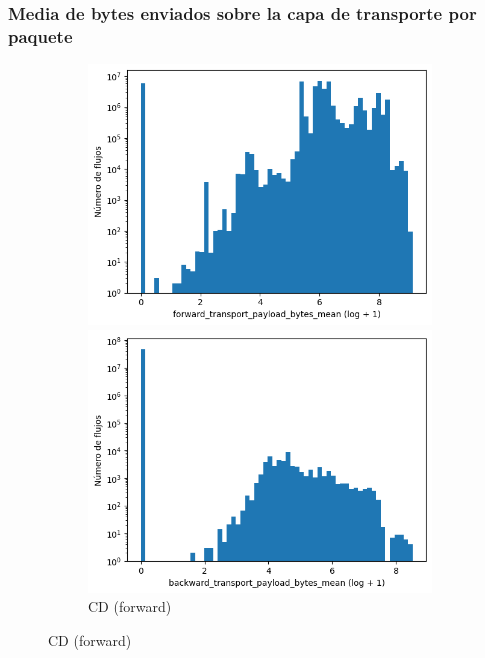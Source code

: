 \subsubsection{Media de bytes enviados sobre la capa de transporte por paquete}

\begin{figure}[H]
    \centering
    \begin{subfigure}[b]{0.26\textwidth}
        \centering
        \includegraphics[width=\textwidth]{media/packet_pincer_cicddos/forward_transport_payload_bytes_mean_log_x_log_y.png}
        \caption{CD (forward)}
        \includegraphics[width=\textwidth]{media/packet_pincer_cicddos/backward_transport_payload_bytes_mean_log_x_log_y.png}

\end{subfigure}
\end{figure}
